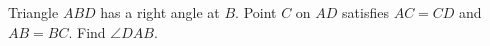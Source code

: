 Triangle $ABD$ has a right angle at $B$. Point $C$ on $AD$ satisfies $AC=CD$ and $AB=BC$. Find $\angle DAB$.
